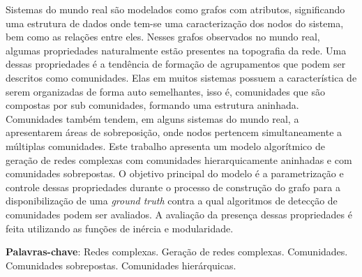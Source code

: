 \documentclass[notes.tex]{subfiles}
\begin{document}
\DoubleSpacing
\begin{resumoumacoluna}
\bigskip

Sistemas do mundo real são modelados como grafos com atributos, significando uma estrutura de dados onde tem-se uma caracterização dos nodos do sistema, bem como as relações entre eles.
Nesses grafos observados no mundo real, algumas propriedades naturalmente estão presentes na topografia da rede.
Uma dessas propriedades é a tendência de formação de agrupamentos que podem ser descritos como comunidades.
Elas em muitos sistemas possuem a característica de serem organizadas de forma auto semelhantes, isso é, comunidades que são compostas por sub comunidades, formando uma estrutura aninhada.
Comunidades também tendem, em alguns sistemas do mundo real, a apresentarem áreas de sobreposição, onde nodos pertencem simultaneamente a múltiplas comunidades.
Este trabalho apresenta um modelo algorítmico de geração de redes complexas com comunidades hierarquicamente aninhadas e com comunidades sobrepostas.
O objetivo principal do modelo é a parametrização e controle dessas propriedades durante o processo de construção do grafo para a disponibilização de uma \emph{ground truth} contra a qual algoritmos de detecção de comunidades podem ser avaliados.
A avaliação da presença dessas propriedades é feita utilizando as funções de inércia e modularidade.

 \vspace{\onelineskip}

 \noindent
 \textbf{Palavras-chave}: Redes complexas. Geração de redes complexas. Comunidades. Comunidades sobrepostas. Comunidades hierárquicas.
\end{resumoumacoluna}
\end{document}
